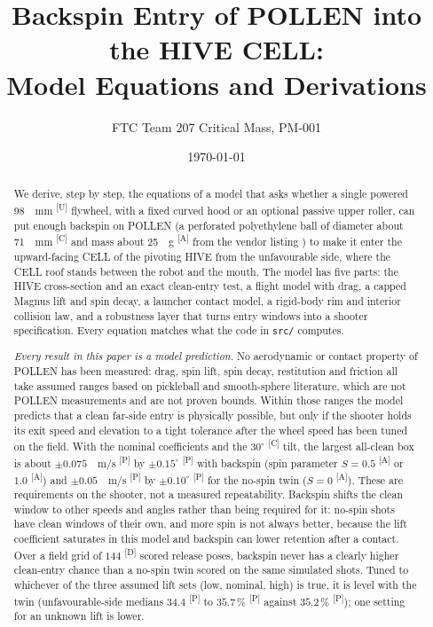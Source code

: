 \documentclass[11pt]{article}
\title{Backspin Entry of POLLEN into the HIVE CELL:\\ Model Equations and Derivations}
\author{FTC Team 207 Critical Mass, PM-001}
\date{\today}
\makeatletter
\DeclareRobustCommand{\provtag}[1]{%
  \ifmmode\text{\provtag@text{#1}}\else\provtag@text{#1}\fi}
\newcommand{\provtag@text}[1]{%
  \textsuperscript{\textsf{\upshape\scriptsize\color@grey[#1]}}}
\newcommand{\color@grey}[1]{#1}
\newcommand{\color@grey}[1]{\pdfliteral{0.45 g}#1\pdfliteral{0 g}}
\DeclareRobustCommand{\confirmed}{\provtag{C}}
\DeclareRobustCommand{\assumed}{\provtag{A}}
\DeclareRobustCommand{\derived}{\provtag{D}}
\DeclareRobustCommand{\predicted}{\provtag{P}}
\DeclareRobustCommand{\userval}{\provtag{U}}
\DeclareRobustCommand{\unit}[1]{%
  \ifmmode\text{\upshape #1}%
  \else
    \ifnum\lastnodetype=10 \,\fi
    \textup{#1}%
  \fi}
\DeclareRobustCommand{\code}[1]{{\def\_{\textunderscore\allowbreak}\texttt{#1}}}
\makeatother
\begin{document}
\maketitle

\begin{abstract}
\noindent
We derive, step by step, the equations of a model that asks whether a single powered
98\,\unit{mm}\userval{} flywheel, with a fixed curved hood or an optional passive upper roller, can
put enough backspin on POLLEN (a perforated polyethylene ball of diameter about
71\,\unit{mm}\confirmed{} and mass about 25\,\unit{g}\assumed{} from the vendor listing \cite{andymark}) to make it enter the upward-facing
CELL of the pivoting HIVE from the unfavourable side, where the CELL roof stands between the robot
and the mouth. The model has five parts: the HIVE cross-section and an exact clean-entry test, a
flight model with drag, a capped Magnus lift and spin decay, a launcher contact model, a rigid-body
rim and interior collision law, and a robustness layer that turns entry windows into a shooter
specification. Every equation matches what the code in \code{src/} computes.

\emph{Every result in this paper is a model prediction.} No aerodynamic or contact property of
POLLEN has been measured: drag, spin lift, spin decay, restitution and friction all take assumed
ranges based on pickleball and smooth-sphere literature, which are not POLLEN measurements and are
not proven bounds. Within those ranges the model predicts that a clean far-side entry is physically
possible, but only if the shooter holds its exit speed and elevation to a tight tolerance after the
wheel speed has been tuned on the field. With the nominal coefficients and the
$30^\circ$\confirmed{} tilt, the largest all-clean box is about $\pm0.075$\,\unit{m/s}\predicted{}
by $\pm0.15^\circ$\predicted{} with backspin (spin parameter $S=0.5$\assumed{} or $1.0$\assumed)
and $\pm0.05$\,\unit{m/s}\predicted{} by $\pm0.10^\circ$\predicted{} for the no-spin twin
($S=0$\assumed). These are requirements on the shooter, not a measured repeatability.
Backspin shifts the clean window to other speeds and angles rather than being required for it:
no-spin shots have clean windows of their own, and more spin is not always better, because the lift
coefficient saturates in this model and backspin can lower retention after a contact.
Over a field grid of $144$\derived{} scored release poses, backspin never has a clearly higher
clean-entry chance than a no-spin twin scored on the same simulated shots. Tuned to whichever of
the three assumed lift sets (low, nominal, high) is true, it is level with the twin
(unfavourable-side medians $34.4$\predicted{} to $35.7\,\%$\predicted{} against
$35.2\,\%$\predicted); one setting for an unknown lift is lower.
\end{abstract}
\end{document}
